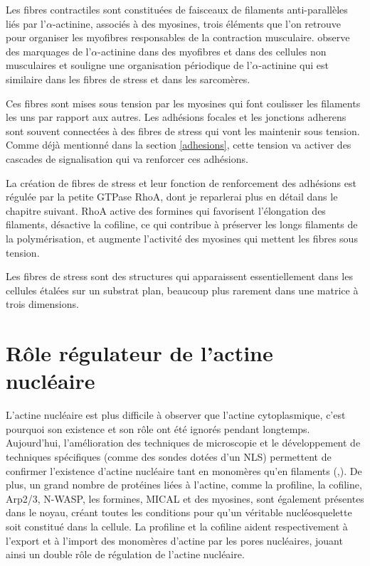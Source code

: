 Les fibres contractiles sont constituées de faisceaux de filaments anti-parallèles liés par l'$\alpha$-actinine, associés à des myosines, trois éléments que l'on retrouve pour organiser les myofibres responsables de la contraction musculaire. \cite{lazarides_-actinin:_1975} observe des marquages de l'$\alpha$-actinine dans des myofibres et dans des cellules non musculaires et souligne une organisation périodique de l'$\alpha$-actinine qui est similaire dans les fibres de stress et dans les sarcomères.

Ces fibres sont mises sous tension par les myosines qui font coulisser les filaments les uns par rapport aux autres. 
Les adhésions focales et les jonctions adherens sont souvent connectées à des fibres de stress qui vont les maintenir sous tension. Comme déjà mentionné dans la section \ref{adhesions}, cette tension va activer des cascades de signalisation qui va renforcer ces adhésions. 

La création de fibres de stress et leur fonction de renforcement des adhésions est régulée par la petite GTPase RhoA, dont je reparlerai plus en détail dans le chapitre suivant. RhoA active des formines qui favorisent l'élongation des filaments, désactive la cofiline, ce qui contribue à préserver les longs filaments de la polymérisation, et augmente l'activité des myosines qui mettent les fibres sous tension. 

Les fibres de stress sont des structures qui apparaissent essentiellement dans les cellules étalées sur un substrat plan, beaucoup plus rarement dans une matrice à trois dimensions. 



\section{Rôle régulateur de l'actine nucléaire}

L'actine nucléaire est plus difficile à observer que l'actine cytoplasmique, c'est pourquoi son existence et son rôle ont été ignorés pendant longtemps. 
Aujourd'hui, l'amélioration des techniques de microscopie et le développement de techniques spécifiques (comme des sondes dotées d'un NLS) permettent de confirmer l'existence d'actine nucléaire tant en monomères qu'en filaments (\cite{mcdonald_nucleoplasmic_2006},\cite{baarlink_nuclear_2013}). 
De plus, un grand nombre de protéines liées à l'actine, comme la profiline, la cofiline, Arp2/3, N-WASP, les formines, MICAL et des myosines, sont également présentes dans le noyau, créant toutes les conditions pour qu'un véritable nucléosquelette soit constitué dans la cellule. 
La profiline et la cofiline aident respectivement à l'export et à l'import des monomères d'actine par les pores nucléaires, jouant ainsi un double rôle de régulation de l'actine nucléaire. 



